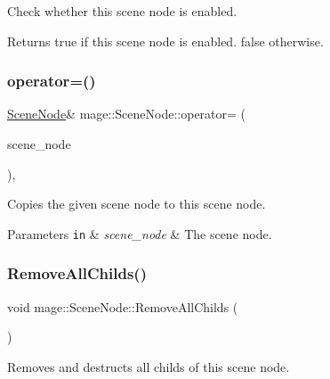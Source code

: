Check whether this scene node is enabled.

\begin{DoxyReturn}{Returns}
{\ttfamily true} if this scene node is enabled. {\ttfamily false} otherwise. 
\end{DoxyReturn}
\hypertarget{classmage_1_1_scene_node_af4298cbc808139f9da43055afdfe8f7e}{}\label{classmage_1_1_scene_node_af4298cbc808139f9da43055afdfe8f7e} 
\subsubsection{\texorpdfstring{operator=()}{operator=()}}
{\footnotesize\ttfamily \hyperlink{classmage_1_1_scene_node}{Scene\+Node}\& mage\+::\+Scene\+Node\+::operator= (\begin{DoxyParamCaption}\item[{const \hyperlink{classmage_1_1_scene_node}{Scene\+Node} \&}]{scene\+\_\+node }\end{DoxyParamCaption})\hspace{0.3cm}{\ttfamily [private]}, {\ttfamily [delete]}}

Copies the given scene node to this scene node.


\begin{DoxyParams}[1]{Parameters}
\mbox{\tt in}  & {\em scene\+\_\+node} & The scene node. \\
\hline
\end{DoxyParams}
\hypertarget{classmage_1_1_scene_node_aabce9f839d51966c9dcdcde46ba9fc0f}{}\label{classmage_1_1_scene_node_aabce9f839d51966c9dcdcde46ba9fc0f} 
\subsubsection{\texorpdfstring{Remove\+All\+Childs()}{RemoveAllChilds()}}
{\footnotesize\ttfamily void mage\+::\+Scene\+Node\+::\+Remove\+All\+Childs (\begin{DoxyParamCaption}{ }\end{DoxyParamCaption})}

Removes and destructs all childs of this scene node. \hypertarget{classmage_1_1_scene_node_a42aa6487f21c948ab7ce6f64a57e5f11}{}\label{classmage_1_1_scene_node_a42aa6487f21c948ab7ce6f64a57e5f11} 
